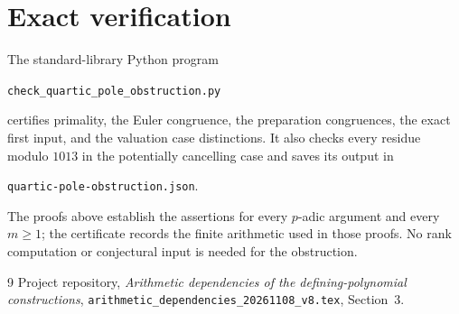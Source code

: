 \documentclass[11pt,a4paper]{article}
\theoremstyle{definition}\newtheorem{definition}[theorem]{Definition}
\begin{document}
\section{Exact verification}
The standard-library Python program
\begin{center}\small
\nolinkurl{check_quartic_pole_obstruction.py}
\end{center}
certifies primality, the Euler congruence, the preparation congruences,
the exact first input, and the valuation case distinctions. It also
checks every residue modulo $1013$ in the potentially cancelling
case and saves its output in
\begin{center}\small
\nolinkurl{quartic-pole-obstruction.json}.
\end{center}
The proofs above establish the assertions for every $p$-adic
argument and every $m\ge1$; the certificate records the finite
arithmetic used in those proofs. No rank computation or conjectural
input is needed for the obstruction.

\begin{thebibliography}{9}
 Project repository,
\emph{Arithmetic dependencies of the defining-polynomial constructions},
\nolinkurl{arithmetic_dependencies_20261108_v8.tex}, Section~3.
\end{thebibliography}
\end{document}
